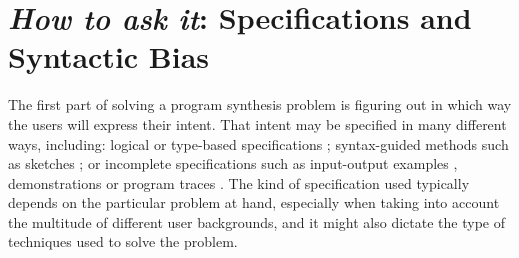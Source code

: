 \section{\textit{How to ask it}: Specifications and Syntactic Bias}
\label{sec:specifications}



The first part of solving a program synthesis problem is figuring out in which
way the users will express their intent.
That intent may be specified in many different ways, including:
  logical \cite{Itzhaky:SIS:2010}
  or type-based specifications \cite{Osera:2015:TPS, Frankle:2016:EST,
    Polikarpova:2016:PSP};
  syntax-guided methods \cite{Alur:sygus:2013} such as
  sketches \cite{Solar-Lezama:2008};
  or incomplete specifications such as
  input-output examples \cite{Frankle:2016:EST, Gulwani:2012:SDM, Leung:2015:IPS},
  demonstrations \cite{Lau2003}
  or program traces \cite{Lau:traces:2003}.
The kind of specification used typically depends on the particular problem at
hand, especially when taking into account the multitude of different user
backgrounds, and it might also dictate the type of techniques used to solve the
problem.



% 


